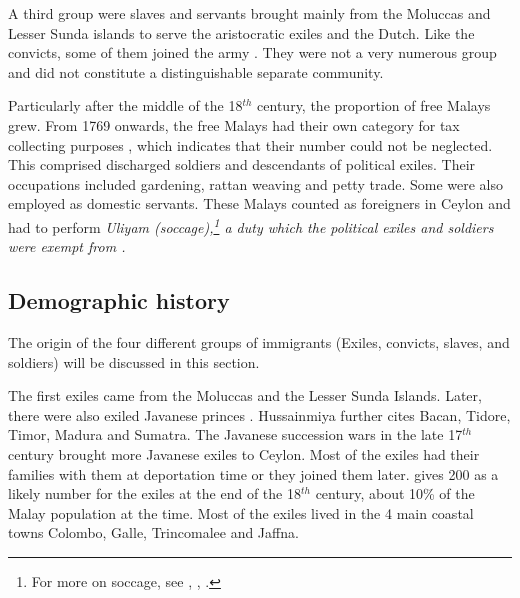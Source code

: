 A third group were slaves and servants brought mainly from the Moluccas and Lesser Sunda islands to serve the aristocratic exiles and the Dutch. Like the convicts, some of them joined the army \citep[48]{Hussainmiya1990}. They were not a very numerous group and did not constitute a distinguishable separate community.

Particularly after the middle of the 18$^{th}$ century, the proportion of free Malays grew. From 1769 onwards, the free Malays had  their own category for tax collecting purposes \citep[9]{Bichsel}, which indicates that their number could not be neglected. This comprised discharged soldiers and descendants of political exiles. Their occupations included gardening, rattan weaving and petty trade. Some  were also employed as domestic servants. These Malays counted as foreigners in Ceylon and had to perform \em Uliyam \em (soccage),\footnote{For more on soccage,  see \citet[31]{Ludowyk1966}, \citet[149f]{Codrington1926}, \citet[164]{Desilva1981}.} a duty which the  political exiles and soldiers were exempt from \citep[48f]{Hussainmiya1990}.



\subsection{Demographic history}\label{sec:slmbg:DemographichistoryunderDutchreign}
The origin of the  four different groups of immigrants (Exiles, convicts, slaves, and soldiers)  will be discussed in this section.

The first exiles came from the Moluccas and the Lesser Sunda Islands.
Later, there were also exiled Javanese princes \citep[38f]{Hussainmiya1990}. Hussainmiya further cites Bacan, Tidore, Timor, Madura and Sumatra. The Javanese
succession wars in the late 17$^{th}$ century brought more Javanese
exiles to Ceylon.  Most of the exiles had their families with them
at deportation time or they joined them later.  \citet[39]{Hussainmiya1990} gives 200 as a likely number for the exiles at the end of the 18$^{th}$ century, about 10\% of the Malay population at the time. Most of the exiles lived in the 4 main coastal towns Colombo, Galle, Trincomalee and Jaffna.

